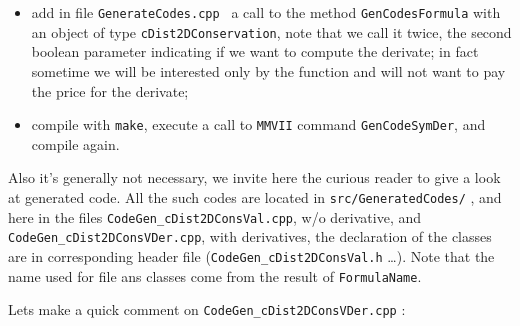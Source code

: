 \begin{itemize}
    \item   add in file  {\tt GenerateCodes.cpp } a call to   the method {\tt GenCodesFormula}
            with an object of type {\tt cDist2DConservation}, note that we call it twice,
            the second boolean parameter indicating if we want to  compute the derivate;
            in fact sometime we will be interested only by the function and will not want
            to pay the price for the derivate;


    \item   compile with {\tt make}, execute a call to {\tt MMVII} command {\tt GenCodeSymDer},
            and compile again.
\end{itemize}


Also it's generally not necessary, we invite here the curious reader to give a look
at generated code.  All the such codes are located in {\tt src/GeneratedCodes/} ,
and here in the files  {\tt CodeGen\_cDist2DConsVal.cpp}, w/o derivative, and 
{\tt CodeGen\_cDist2DConsVDer.cpp}, with derivatives, the declaration of the classes
are in corresponding header file ({\tt CodeGen\_cDist2DConsVal.h} \dots). 
Note that the name used for file ans classes come from the result of {\tt FormulaName}.

Lets make a quick comment on {\tt CodeGen\_cDist2DConsVDer.cpp} :

